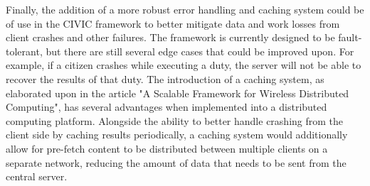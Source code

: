 \documentclass[11pt]{article}
\begin{document}
Finally, the addition of a more robust error handling and caching system could be of use in the CIVIC framework to better mitigate data and work losses from client crashes and other failures. The framework is currently designed to be fault-tolerant, but there are still several edge cases that could be improved upon. For example, if a citizen crashes while executing a duty, the server will not be able to recover the results of that duty. The introduction of a caching system, as elaborated upon in the article "A Scalable Framework for Wireless Distributed Computing", has several advantages when implemented into a distributed computing platform. Alongside the ability to better handle crashing from the client side by caching results periodically, a caching system would additionally allow for pre-fetch content to be distributed between multiple clients on a separate network, reducing the amount of data that needs to be sent from the central server.


\newpage
\thispagestyle{empty}

 
\end{document}
